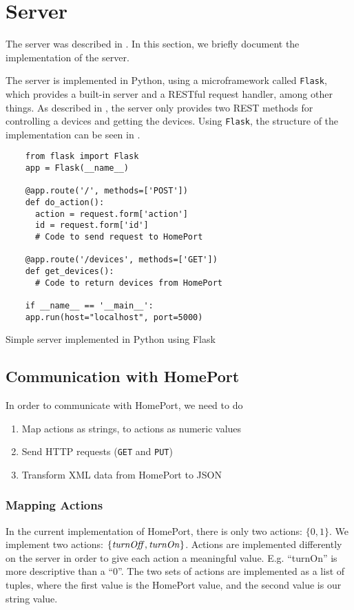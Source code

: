 \section{Server}\label{sec:serverimplementation}
The server was described in . 
In this section, we briefly document the implementation of the server.

The server is implemented in Python,
using a microframework called \texttt{Flask},
which provides a built-in server and a RESTful request handler, among other things. 
As described in , 
the server only provides two REST methods for controlling a devices and getting the devices. 
Using \texttt{Flask}, the structure of the implementation can be seen in .

\begin{listing}
  \begin{verbatim}
    from flask import Flask
    app = Flask(__name__)
    
    @app.route('/', methods=['POST'])
    def do_action():
      action = request.form['action']
      id = request.form['id']
      # Code to send request to HomePort
      
    @app.route('/devices', methods=['GET'])
    def get_devices():
      # Code to return devices from HomePort
    
    if __name__ == '__main__':
    app.run(host="localhost", port=5000)
  \end{verbatim}
  \caption{Simple server implemented in Python using Flask}
  \label{lst:server}
\end{listing}

\subsection{Communication with HomePort}
In order to communicate with HomePort, 
we need to do
\begin{enumerate}
  \item Map actions as strings, to actions as numeric values
  \item Send HTTP requests (\texttt{GET} and \texttt{PUT})
  \item Transform XML data from HomePort to JSON
\end{enumerate}

\subsubsection{Mapping Actions}
In the current implementation of HomePort, 
there is only two actions: $\{0, 1\}$.
We implement two actions: $\{\var{turnOff}, \var{turnOn}\}$. Actions are implemented differently on the server in order to give each action a meaningful value. E.g. ``turnOn'' is more descriptive than a ``0''.
The two sets of actions are implemented as a list of tuples, 
where the first value is the HomePort value, 
and the second value is our string value. 

